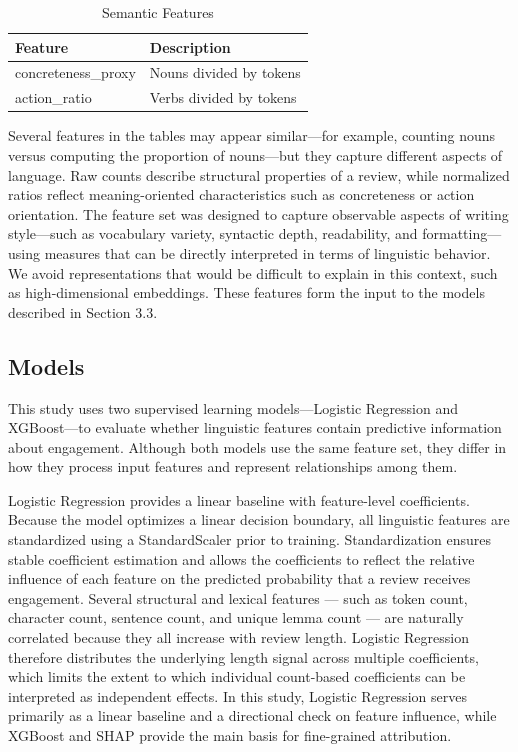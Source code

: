 \documentclass[12pt]{article}
\begin{document}
\begin{longtable}{ll}
\caption{Semantic Features} \\
\textbf{Feature} & \textbf{Description} \\
\hline
concreteness\_proxy & Nouns divided by tokens \\
action\_ratio & Verbs divided by tokens \\
\end{longtable}

Several features in the tables may appear similar—for example, counting nouns versus computing the proportion of nouns—but they capture different aspects of language. Raw counts describe structural properties of a review, while normalized ratios reflect meaning-oriented characteristics such as concreteness or action orientation. The feature set was designed to capture observable aspects of writing style—such as vocabulary variety, syntactic depth, readability, and formatting—using measures that can be directly interpreted in terms of linguistic behavior. We avoid representations that would be difficult to explain in this context, such as high-dimensional embeddings. These features form the input to the models described in Section 3.3.

\subsection{Models}

This study uses two supervised learning models—Logistic Regression and XGBoost—to evaluate whether linguistic features contain predictive information about engagement. Although both models use the same feature set, they differ in how they process input features and represent relationships among them.

Logistic Regression provides a linear baseline with feature-level coefficients. Because the model optimizes a linear decision boundary, all linguistic features are standardized using a StandardScaler prior to training. Standardization ensures stable coefficient estimation and allows the coefficients to reflect the relative influence of each feature on the predicted probability that a review receives engagement.
Several structural and lexical features — such as token count, character count, sentence count, and unique lemma count — are naturally correlated because they all increase with review length. Logistic Regression therefore distributes the underlying length signal across multiple coefficients, which limits the extent to which individual count-based coefficients can be interpreted as independent effects. In this study, Logistic Regression serves primarily as a linear baseline and a directional check on feature influence, while XGBoost and SHAP provide the main basis for fine-grained attribution.
\end{document}
